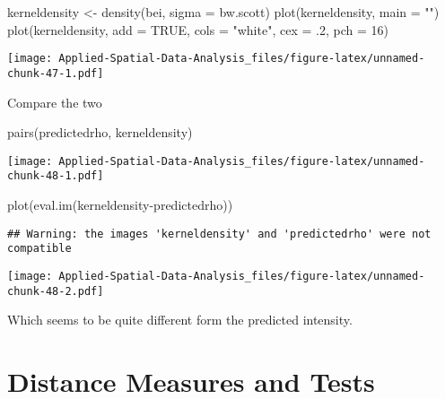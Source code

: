 \documentclass[
]{book}
\newenvironment{Shaded}{\begin{snugshade}}{\end{snugshade}}
\newcommand{\AttributeTok}[1]{\textcolor[rgb]{0.77,0.63,0.00}{#1}}
\newcommand{\ConstantTok}[1]{\textcolor[rgb]{0.00,0.00,0.00}{#1}}
\newcommand{\DecValTok}[1]{\textcolor[rgb]{0.00,0.00,0.81}{#1}}
\newcommand{\FunctionTok}[1]{\textcolor[rgb]{0.00,0.00,0.00}{#1}}
\newcommand{\NormalTok}[1]{#1}
\newcommand{\OtherTok}[1]{\textcolor[rgb]{0.56,0.35,0.01}{#1}}
\newcommand{\SpecialCharTok}[1]{\textcolor[rgb]{0.00,0.00,0.00}{#1}}
\newcommand{\StringTok}[1]{\textcolor[rgb]{0.31,0.60,0.02}{#1}}
\begin{document}
\begin{Shaded}
\begin{Highlighting}[]
\NormalTok{kerneldensity }\OtherTok{\textless{}{-}} \FunctionTok{density}\NormalTok{(bei, }\AttributeTok{sigma =}\NormalTok{ bw.scott)}
\FunctionTok{plot}\NormalTok{(kerneldensity, }\AttributeTok{main =} \StringTok{""}\NormalTok{)}
\FunctionTok{plot}\NormalTok{(kerneldensity, }\AttributeTok{add =} \ConstantTok{TRUE}\NormalTok{, }\AttributeTok{cols =} \StringTok{"white"}\NormalTok{, }\AttributeTok{cex =}\NormalTok{ .}\DecValTok{2}\NormalTok{, }\AttributeTok{pch =} \DecValTok{16}\NormalTok{)}
\end{Highlighting}
\end{Shaded}

\texttt{[image: Applied-Spatial-Data-Analysis\_files/figure-latex/unnamed-chunk-47-1.pdf]}

Compare the two

\begin{Shaded}
\begin{Highlighting}[]
\FunctionTok{pairs}\NormalTok{(predictedrho, kerneldensity)}
\end{Highlighting}
\end{Shaded}

\texttt{[image: Applied-Spatial-Data-Analysis\_files/figure-latex/unnamed-chunk-48-1.pdf]}

\begin{Shaded}
\begin{Highlighting}[]
\FunctionTok{plot}\NormalTok{(}\FunctionTok{eval.im}\NormalTok{(kerneldensity}\SpecialCharTok{{-}}\NormalTok{predictedrho))}
\end{Highlighting}
\end{Shaded}

\begin{verbatim}
## Warning: the images 'kerneldensity' and 'predictedrho' were not compatible
\end{verbatim}

\texttt{[image: Applied-Spatial-Data-Analysis\_files/figure-latex/unnamed-chunk-48-2.pdf]}

Which seems to be quite different form the predicted intensity.

\hypertarget{distance-measures-and-tests}{%
\section{Distance Measures and Tests}\label{distance-measures-and-tests}}
\end{document}
